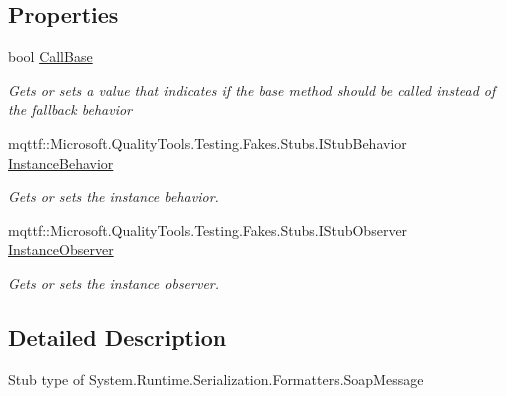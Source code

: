 \subsection*{Properties}
\begin{DoxyCompactItemize}
\item 
bool \hyperlink{class_system_1_1_runtime_1_1_serialization_1_1_formatters_1_1_fakes_1_1_stub_soap_message_a47b0a733c152fb9466b1f1e11492771a}{Call\-Base}
\begin{DoxyCompactList}\small\item\em Gets or sets a value that indicates if the base method should be called instead of the fallback behavior\end{DoxyCompactList}\item 
mqttf\-::\-Microsoft.\-Quality\-Tools.\-Testing.\-Fakes.\-Stubs.\-I\-Stub\-Behavior \hyperlink{class_system_1_1_runtime_1_1_serialization_1_1_formatters_1_1_fakes_1_1_stub_soap_message_a4906b2c499691f2f1cd2c96f9f8486f4}{Instance\-Behavior}
\begin{DoxyCompactList}\small\item\em Gets or sets the instance behavior.\end{DoxyCompactList}\item 
mqttf\-::\-Microsoft.\-Quality\-Tools.\-Testing.\-Fakes.\-Stubs.\-I\-Stub\-Observer \hyperlink{class_system_1_1_runtime_1_1_serialization_1_1_formatters_1_1_fakes_1_1_stub_soap_message_acc64d768e3c502c31bb7a45d3eadcc3f}{Instance\-Observer}
\begin{DoxyCompactList}\small\item\em Gets or sets the instance observer.\end{DoxyCompactList}\end{DoxyCompactItemize}


\subsection{Detailed Description}
Stub type of System.\-Runtime.\-Serialization.\-Formatters.\-Soap\-Message



